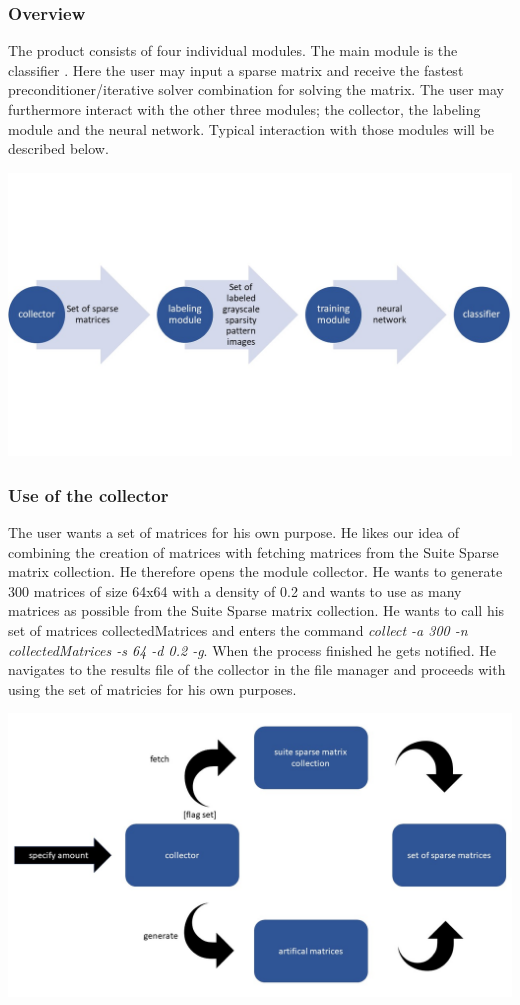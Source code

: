 \documentclass[parskip=full]{scrartcl}
\begin{document}
\subsubsection{Overview}
The product consists of four individual modules. The main module is the \gls{classifier} . Here the user may input a sparse matrix and receive the fastest \gls{preconditioner}/\gls{iterative solver} combination for solving the matrix. The user may furthermore interact with the other three modules; the \gls{collector}, the \gls{labeling module} and the \gls{neural network}.  Typical interaction with those modules will be described below.
\begin{center}
\includegraphics[width=\textwidth]{workflow}
\end{center}


\subsubsection{Use of the \gls{collector}}
The user wants a set of matrices for his own purpose. He likes our idea of combining the creation of matrices with fetching matrices from the \gls{Suite Sparse} matrix collection. He therefore opens the module \gls{collector}. He wants to generate 300 matrices of size 64x64 with a density of 0.2 and wants to use as many matrices as possible from the \gls{Suite Sparse} matrix collection. He wants to call his set of matrices collectedMatrices and enters the command \textit{collect -a 300 -n collectedMatrices -s 64 -d 0.2 -g}. When the process finished he gets notified. He navigates to the results file of the \gls{collector} in the file manager and proceeds with using the set of matricies for his own purposes.
\begin{center}
\includegraphics[width=\textwidth]{collector}
\end{center}
\end{document}
